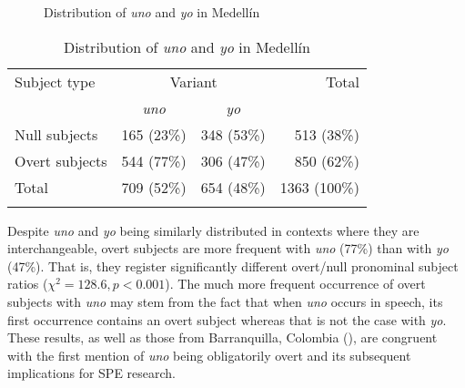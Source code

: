 \documentclass[output=paper]{langscibook}
\begin{document}
\begin{figure}
  \caption{\label{fig:orozco:1}Distribution of \textit{uno} and \textit{yo} in Medellín}
\end{figure}

\begin{table}
\begin{tabular}{lccr}
\lsptoprule
{Subject type} & \multicolumn{2}{c}{{Variant}} & {Total}\\\cmidrule(lr){2-3}
& {\itshape {uno}}& {\itshape {yo}} & \\
\midrule
Null subjects &  165 (23\%) &  348 (53\%) &  513 (38\%)\\
Overt subjects &  544 (77\%) &  306 (47\%) &  850 (62\%)\\
Total  &  709 (52\%) &  654 (48\%) &  1363 (100\%)\\
\lspbottomrule
\end{tabular}
\caption{Distribution of \textit{uno} and \textit{yo} in Medellín\label{tab:orozco:2}}
\end{table}

Despite \textit{uno} and \textit{yo} being similarly distributed in contexts where they are interchangeable, overt subjects are more frequent with \textit{uno} (77\%) than with \textit{yo} (47\%). That is, they register significantly different overt/null pronominal subject ratios ($\chi^2 = 128.6,\allowbreak p < 0.001$). The much more frequent occurrence of overt subjects with \textit{uno} may stem from the fact that when \textit{uno} occurs in speech, its first occurrence contains an overt subject whereas that is not the case with \textit{yo}. These results, as well as those from Barranquilla, Colombia (\citealt[51]{HurtadoOrtega-Santos2019}), are congruent with the first mention of \textit{uno} being obligatorily overt and its subsequent implications for SPE research. 
\end{document}
